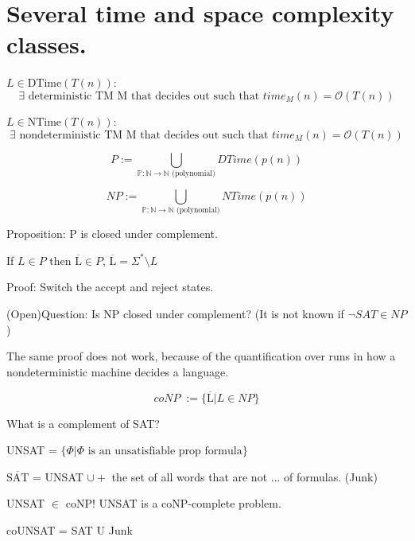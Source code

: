 \documentclass[a4paper,12pt]{article}
\theoremstyle{definition}
\theoremstyle{remark}
\newcommand{\N}{\mathbb{N}}
\newcommand{\Pp}{\mathbb{P}}
\begin{document}
\newpage
\section{Several time and space complexity classes.}

$L \in \text{DTime}(T(n))$:
\begin{equation*}
    \exists \text{ deterministic TM M that decides out such that } time_M(n) = \mathscr{O}(T(n))
\end{equation*}

$L \in \text{NTime}(T(n))$: 
\begin{equation*}
    \exists \text{ nondeterministic TM M that decides out such that } time_M(n) = \mathscr{O}(T(n))
\end{equation*}

\begin{equation*}
    P := \bigcup\limits_{\Pp: \N \to \N \text{ (polynomial)}} DTime(p(n))
\end{equation*}


\begin{equation*}
    NP := \bigcup\limits_{\Pp: \N \to \N \text{ (polynomial)}} NTime(p(n))
\end{equation*}

Proposition: P is closed under complement.

If $L \in P$ then $\overline{\text{L}} \in P$, $\overline{\text{L}} = \Sigma^* \setminus L$

Proof: Switch the accept and reject states.

(Open)Question: Is NP closed under complement? (It is not known if $\neg SAT \in NP$)

The same proof does not work, because of the quantification over runs in how a nondeterministic machine decides a language.

\begin{equation*}
    coNP \; := \{ \overline{\text{L}} | L \in NP\}
\end{equation*}

What is a complement of SAT?

UNSAT = $\{\Phi | \Phi \text{ is an unsatisfiable prop formula}\}$

$\overline{\text{SAT}}$ = UNSAT $\cup +$ the set of all words that are not ... of formulas. (Junk) %

UNSAT $\in$ coNP! UNSAT is a coNP-complete problem.

coUNSAT = SAT U Junk
\end{document}

